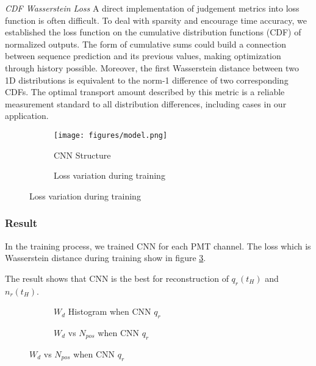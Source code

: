 \emph{CDF Wasserstein Loss}
A direct implementation of judgement metrics into loss function is often difficult. To deal with sparsity and encourage time accuracy, we established the loss function on the cumulative distribution functions (CDF) of normalized outputs. The form of cumulative sums could build a connection between sequence prediction and its previous values, making optimization through history possible. Moreover, the first Wasserstein distance between two 1D distributions is equivalent to the norm-1 difference of two corresponding CDFs. The optimal transport amount described by this metric is a reliable measurement standard to all distribution differences, including cases in our application.

\begin{figure}[H]
\begin{minipage}{.3\textwidth}
\begin{figure}[H]
    \centering
    \texttt{[image: figures/model.png]}
    \caption{\label{fig:struct} CNN Structure}
\end{figure}
\end{minipage}
\begin{minipage}{.7\textwidth}
\begin{figure}[H]
    \centering
    \scalebox{0.4}{}
    \caption{\label{fig:loss} Loss variation during training}
\end{figure}
\end{minipage}
\end{figure}

\subsubsection{Result}
In the training process, we trained CNN for each PMT channel. The loss which is Wasserstein distance during training show in figure \ref{fig:loss}. 

The result shows that CNN is the best for reconstruction of $q_{r}(t_{H})$ and $n_{r}(t_{H})$. 

\begin{figure}[H]
    \begin{subfigure}{0.5\textwidth}
        \centering
        \scalebox{0.4}{}
        \caption{$W_{d}$ Histogram when CNN $q_{r}$}
    \end{subfigure}
    \begin{subfigure}{0.5\textwidth}
        \centering
        \scalebox{0.4}{}
        \caption{$W_{d}$ vs $N_{pos}$ when CNN $q_{r}$}
    \end{subfigure}
\end{figure}

